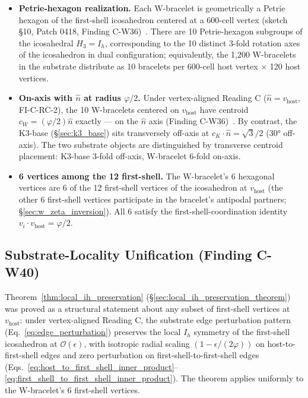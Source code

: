 \documentclass[11pt,letterpaper]{article}
\newcommand{\phig}{\varphi}
\begin{document}
\begin{itemize}\setlength\itemsep{0.2em}
    \item \textbf{Petrie-hexagon realization.} Each W-bracelet is geometrically a Petrie hexagon of the first-shell icosahedron centered at a 600-cell vertex (sketch \S10, Patch 0418, Finding C-W36)~\cite{abshier_capotauro_chiral_mechanism_sketch}. There are 10 Petrie-hexagon subgroups of the icosahedral $H_3 = I_h$, corresponding to the 10 distinct 3-fold rotation axes of the icosahedron in dual configuration; equivalently, the 1{,}200 W-bracelets in the substrate distribute as 10 bracelets per 600-cell host vertex $\times$ 120 host vertices.
    \item \textbf{On-axis with $\hat{n}$ at radius $\phig/2$.} Under vertex-aligned Reading C ($\hat{n} = v_{\text{host}}$, FI-C-RC-2), the 10 W-bracelets centered on $v_{\text{host}}$ have centroid $c_W = (\phig/2)\hat{n}$ exactly --- on the $\hat{n}$ axis (Finding C-W36)~\cite{abshier_capotauro_chiral_mechanism_sketch}. By contrast, the K3-base (\S\ref{sec:k3_base}) sits transversely off-axis at $\hat{c}_K \cdot \hat{n} = \sqrt{3}/2$ ($30°$ off-axis). The two substrate objects are distinguished by transverse centroid placement: K3-base 3-fold off-axis, W-bracelet 6-fold on-axis.
    \item \textbf{6 vertices among the 12 first-shell.} The W-bracelet's 6 hexagonal vertices are 6 of the 12 first-shell vertices of the icosahedron at $v_{\text{host}}$ (the other 6 first-shell vertices participate in the bracelet's antipodal partners; \S\ref{sec:w_zeta_inversion}). All 6 satisfy the first-shell-coordination identity $v_i \cdot v_{\text{host}} = \phig/2$.
\end{itemize}

\subsection{Substrate-Locality Unification (Finding C-W40)}\label{sec:w_substrate_locality_unification}

Theorem~\ref{thm:local_ih_preservation} (\S\ref{sec:local_ih_preservation_theorem}) was proved as a structural statement about any subset of first-shell vertices at $v_{\text{host}}$: under vertex-aligned Reading C, the substrate edge perturbation pattern (Eq.~\eqref{eq:edge_perturbation}) preserves the local $I_h$ symmetry of the first-shell icosahedron at $\mathcal{O}(\epsilon)$, with isotropic radial scaling $(1 - \epsilon/(2\phig))$ on host-to-first-shell edges and zero perturbation on first-shell-to-first-shell edges (Eqs.~\eqref{eq:host_to_first_shell_inner_product}--\eqref{eq:first_shell_to_first_shell_inner_product}). The theorem applies uniformly to the W-bracelet's 6 first-shell vertices.
\end{document}
